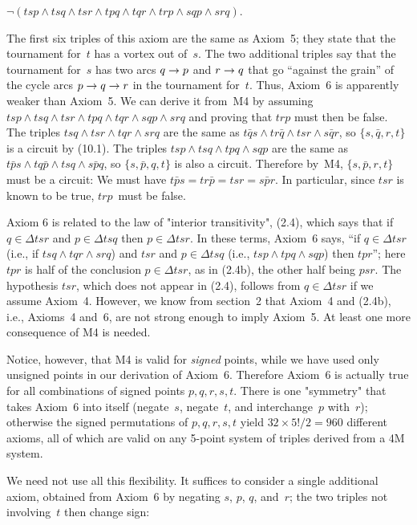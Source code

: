 \quad
$\neg(tsp\wedge tsq\wedge tsr\wedge tpq\wedge tqr\wedge trp\wedge
sqp\wedge srq)$.

\bn
The first six triples of this axiom are the same as Axiom~5; they
state that the tournament for~$t$ has a vortex out of~$s$. The two
additional triples say that the tournament for~$s$ has two arcs $q\rightarrow
p$ and $r\rightarrow q$ that go ``against the grain'' of the cycle arcs $p\rightarrow q\rightarrow
r$ in the tournament for~$t$. Thus, Axiom~6 is apparently weaker than
Axiom~5. We can derive it from~M4 by assuming $tsp\wedge tsq\wedge
tsr\wedge tpq\wedge tqr\wedge sqp\wedge srq$ and proving that $trp$
must then be false. The triples $tsq\wedge tsr\wedge tqr\wedge srq$
are the same as $t\bar{q}s\wedge tr\bar{q}\wedge tsr\wedge s\bar{q}r$,
so $\{s,\bar{q},r,t\}$ is a circuit by (10.1). The triples $tsp\wedge
tsq\wedge tpq\wedge sqp$ are the same as $t\bar{p}s\wedge
tq\bar{p}\wedge tsq\wedge s\bar{p}q$, so $\{s,\bar{p},q,t\}$ is also a
circuit. Therefore by~M4, $\{s,\bar{p},r,t\}$ must be a circuit: We
must have $t\bar{p}s=tr\bar{p}=tsr=s\bar{p}r$. In particular, since
$tsr$ is known to be true, $trp$~must be false.

Axiom 6 is related to the law of "interior transitivity", (2.4), which
says that if $q\in\Delta tsr$ and $p\in\Delta tsq$ then $p\in\Delta
tsr$. In these terms, Axiom~6 says, ``if $q\in\Delta tsr$ (i.e.,
if $tsq\wedge tqr\wedge srq$) and $tsr$ and $p\in\Delta tsq$ (i.e.,
$tsp\wedge tpq\wedge sqp$) then $tpr$''; here $tpr$ is half of the
conclusion $p\in\Delta tsr$, as in (2.4b), the other half being $psr$. The
hypothesis $tsr$, which does not appear in (2.4), follows from
$q\in\Delta tsr$ if we assume Axiom~4. However, we know from section~2
that Axiom~4 and (2.4b),
i.e., Axioms~4 and~6, are not strong enough to imply Axiom~5.
 At least one more consequence of M4 is needed.

Notice, however, that M4 is valid for {\it signed\/} points, while we
have used only unsigned points in our derivation of Axiom~6. Therefore
Axiom~6 is actually true for all combinations of signed points
$p,q,r,s,t$. There is one "symmetry" that takes Axiom~6 into itself
(negate~$s$, negate~$t$, and interchange~$p$ with~$r$); otherwise the
signed permutations of $p,q,r,s,t$ yield $32\times 5!/2=960$ different
axioms, all of which are valid on any 5-point system of triples
derived from a 4M system.

We need not use all this flexibility. It suffices to consider a single
additional axiom, obtained from Axiom~6 by negating $s$, $p$, $q$,
and~$r$; the two triples not involving~$t$ then change sign:

